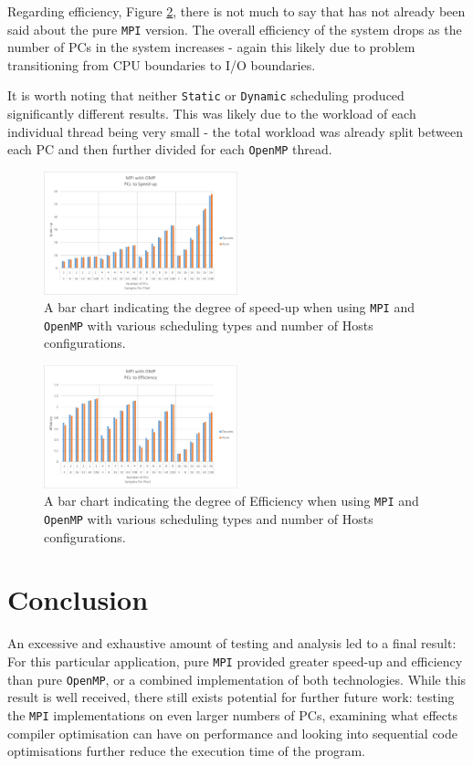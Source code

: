 \documentclass[journal,transmag]{IEEEtran}
\begin{document}
			Regarding efficiency, Figure \ref{fig_ompi_eff}, there is not much to say that has not already been said about the pure \texttt{MPI} version. The overall efficiency of the system drops as the number of PCs in the system increases - again this likely due to problem transitioning from CPU boundaries to I/O boundaries.
			
			It is worth noting that neither \texttt{Static} or \texttt{Dynamic} scheduling produced significantly different results. This was likely due to the workload of each individual thread being very small - the total workload was already split between each PC and then further divided for each \texttt{OpenMP} thread.
			
		\begin{figure}[h]
			\centering
			\includegraphics[width = 0.5\textwidth]{chartOMPISpeed}
			\caption{A bar chart indicating the degree of speed-up when using \texttt{MPI} and \texttt{OpenMP} with various scheduling types and number of Hosts configurations.}
			\label{fig_ompi_speed}
		\end{figure}
		
		\begin{figure}[h]
			\centering
			\includegraphics[width = 0.5\textwidth]{chartOMPIEff}
			\caption{A bar chart indicating the degree of Efficiency when using \texttt{MPI} and \texttt{OpenMP} with various scheduling types and number of Hosts configurations.}
			\label{fig_ompi_eff}
		\end{figure}

	
\section{Conclusion}
	An excessive and exhaustive amount of testing and analysis led to a final result: For this particular application, pure \texttt{MPI} provided greater speed-up and efficiency than pure \texttt{OpenMP}, or a combined implementation of both technologies. While this result is well received, there still exists potential for further future work: testing the \texttt{MPI} implementations on even larger numbers of PCs, examining what effects compiler optimisation can have on performance and looking into sequential code optimisations further reduce the execution time of the program.
	 
\end{document}
